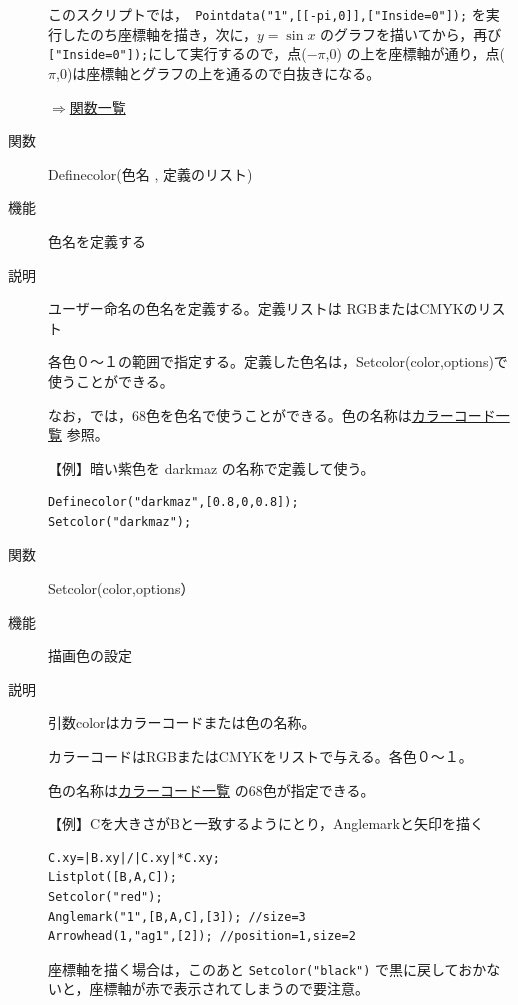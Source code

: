 \documentclass[papersize,a4paper,12pt,uplatex]{jsarticle}
\begin{document}
\begin{description}
このスクリプトでは，\verb| Pointdata("1",[[-pi,0]],["Inside=0"]);| を実行したのち座標軸を描き，次に，$y=\sin x$ のグラフを描いてから，再び \verb| ["Inside=0"]);|にして実行するので，点($-\pi$,0) の上を座標軸が通り，点($\pi$,0)は座標軸とグラフの上を通るので白抜きになる。

\begin{flushright}\hyperlink{functionlist}{$\Rightarrow$関数一覧}\end{flushright}

\vspace{\baselineskip}
\hypertarget{definecolor}{}
\item[関数]Definecolor(色名 , 定義のリスト)
\item[機能]色名を定義する
\item[説明]ユーザー命名の色名を定義する。定義リストは RGBまたはCMYKのリスト

各色０〜１の範囲で指定する。定義した色名は，Setcolor(color,options)で使うことができる。

なお，\ketcindy では，68色を色名で使うことができる。色の名称は\hyperlink{colorcodelist}{カラーコード一覧} 参照。

\vspace{\baselineskip}
【例】暗い紫色を darkmaz の名称で定義して使う。
\begin{verbatim}
Definecolor("darkmaz",[0.8,0,0.8]);
Setcolor("darkmaz");
\end{verbatim}


\vspace{\baselineskip}
\hypertarget{setcolor}{}
\item[関数]Setcolor(color,options）
\item[機能]描画色の設定
\item[説明]引数colorはカラーコードまたは色の名称。

カラーコードはRGBまたはCMYKをリストで与える。各色０〜１。

色の名称は\hyperlink{colorcodelist}{カラーコード一覧} の68色が指定できる。


\vspace{\baselineskip}
【例】Cを大きさがBと一致するようにとり，Anglemarkと矢印を描く
\begin{verbatim}
C.xy=|B.xy|/|C.xy|*C.xy;
Listplot([B,A,C]);
Setcolor("red");
Anglemark("1",[B,A,C],[3]); //size=3
Arrowhead(1,"ag1",[2]); //position=1,size=2
\end{verbatim}

座標軸を描く場合は，このあと \verb|Setcolor("black")| で黒に戻しておかないと，座標軸が赤で表示されてしまうので要注意。



\end{description}
\end{document}
